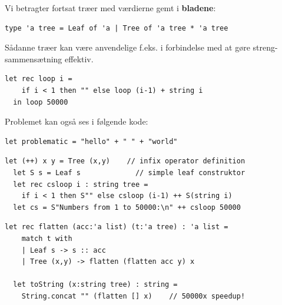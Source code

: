 \documentclass[rgb]{beamer}
\begin{document}
\begin{frame}[fragile]
\begin{footnotesize}


  Vi betragter fortsat træer med værdierne gemt i \textbf{bladene}:

  \vspace{1ex}

\begin{lstlisting}[numbers=none,frame=none,mathescape]
type 'a tree = Leaf of 'a | Tree of 'a tree * 'a tree
\end{lstlisting}
  \vspace{1ex}

Sådanne træer kan være anvendelige f.eks. i forbindelse med at gøre streng-sammensætning effektiv.


\begin{lstlisting}[numbers=none,frame=none,mathescape]
  let rec loop i =
    if i < 1 then "" else loop (i-1) + string i
  in loop 50000
\end{lstlisting}

\vspace{1ex}
Problemet kan også ses i følgende kode:
\vspace{1ex}
\begin{lstlisting}[numbers=none,frame=none,mathescape]
  let problematic = "hello" + " " + "world"
\end{lstlisting}

\end{footnotesize}
\end{frame}

\begin{frame}[fragile]
\begin{footnotesize}

  \vspace{1ex}
\begin{lstlisting}[numbers=none,frame=none,mathescape]
  let (++) x y = Tree (x,y)    // infix operator definition
  let S s = Leaf s             // simple leaf construktor
  let rec csloop i : string tree =
    if i < 1 then S"" else csloop (i-1) ++ S(string i)
  let cs = S"Numbers from 1 to 50000:\n" ++ csloop 50000
\end{lstlisting}

  \vspace{1ex}
  \vspace{1ex}
\begin{lstlisting}[numbers=none,frame=none,mathescape]
  let rec flatten (acc:'a list) (t:'a tree) : 'a list =
    match t with
    | Leaf s -> s :: acc
    | Tree (x,y) -> flatten (flatten acc y) x

  let toString (x:string tree) : string =
    String.concat "" (flatten [] x)    // 50000x speedup!
\end{lstlisting}

\end{footnotesize}
\end{frame}
\end{document}
